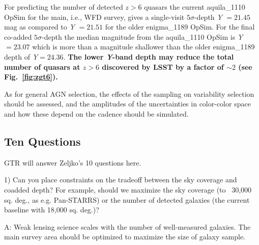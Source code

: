 For predicting the number of detected $z>6$ quasars
the current 
aquila\_{}1110 OpSim for the main, i.e., WFD survey, gives a
single-visit $5\sigma$-depth
{\it Y} $= 21.45$ mag as compared to {\it Y} $= 21.51$ for the older enigma\_{}1189 OpSim.
For the final co-added $5\sigma$-depth the median magnitude from the aquila\_{}1110
OpSim is 
{\it Y}$ = 23.07$ which is more than a magnitude shallower than the older enigma\_{}1189 
depth of {\it Y}$ = 24.36$.
{\bf The lower {\it Y}-band depth may reduce the total number of quasars at $z > 6$ discovered by LSST by
a factor of $\sim 2$
(see Fig.~\ref{fig:zgt6}).}



As for general AGN selection, the effects of the sampling on variability selection
should be assessed, and the amplitudes of the uncertainties in color-color space
and how these depend on the cadence should be simulated.

%
%
%
%

\subsection{Ten Questions}

GTR will answer Zeljko's 10 questions here.

1) Can you place constraints on the tradeoff between the sky coverage and coadded depth?
For example, should we maximize the sky coverage (to ~30,000 sq. deg., as e.g. Pan-STARRS)
or the number of detected galaxies (the current baseline with 18,000 sq. deg.)?

A: Weak lensing science scales with the number of well-measured galaxies. The main
survey area should be optimized to maximize the size of galaxy sample.

